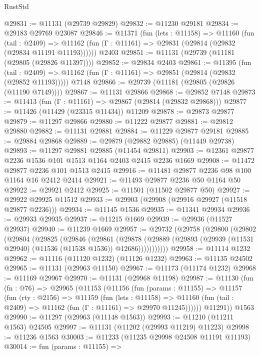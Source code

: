 \begin{lexlean}{RustStd}
\begin{coremodule}
@29831 := @11131 (@29739 @29829)
@29832 := @11230 @29181
@29834 := @29183 @29769 @23087
@29846 := @11371
    (fun (lets : @11158) =>
    @11160
      (fun (tail : @2409) =>
      @11162 (fun (Γ : @11161) => @29831 (@29814 (@29832 (@29834 @11191 @11193))))))
    @2403
@29851 := @11131 (@29739 (@11181 (@29805 (@29826 @11397))))
@29852 := @29834 @2403
@29861 := @11395
    (fun (tail : @2409) => @11162 (fun (Γ : @11161) => @29851 (@29814 (@29832 (@29852 @11193)))))
    @7148
@29866 := @29739 (@11181 (@29805 (@29826 (@11190 @7149))))
@29867 := @11131 @29866
@29868 := @29852 @7148
@29873 := @11413 (fun (Γ : @11161) => @29867 (@29814 (@29832 @29868)))
@29877 := @11426 (@11429 (@23315 @11434)) @11209
@29878 := @29873 @29877
@29879 := @11297 @29866
@29880 := @11222 @29877
@29881 := @29812 @29880
@29882 := @11131 @29881
@29884 := @11229 @29877 @29181
@29885 := @29884 @29868
@29889 := @29879 (@29882 @29885) (@11449 @29738)
@29893 := @11297 @29881 @29885 (@11454 @29811)
@29903 := @12361 @29877 @2236 @1536 @101 @1513 @1164 @2403 @2415 @2236 @1669
@29908 := @11472 @29877 @2236 @101 @1513 @2415
@29916 := @11481 @29877 @2236 @98 @100 @1164 @16 @2412 @2414
@29921 := @11493 @29877 @2236 @50 @1164 @50
@29922 := @29921 @2412
@29925 := @11501 (@11502 @29877 @50)
@29927 := @29922 @29925 @11512
@29933 := @29903 (@29908 (@29916 @29927 (@11518 @29877 @2236)))
@29934 := @11145 @1536
@29935 := @11341 @29934
@29936 := @29933 @29935
@29937 := @11215 @1669
@29939 := @29936 (@11527 @29937)
@29940 := @11239 @1669
@29957 := @29732
    (@29758
      (@29800
        (@29802
          (@29804
            (@29825
              (@29846
                (@29861
                  (@29878
                    (@29889
                      (@29893 (@29939 (@11531 @29940) (@11536 (@11538 @1536)) @12686)))))))))))
@29958 := @11114 @1232
@29962 := @11116 (@11120 @1232) (@11126 @1232)
@29963 := @11135 @24502
@29965 := @11131 (@29963 @11150)
@29967 := @11173 (@11174 @1232)
@29968 := @11169 @29967
@29970 := @11131 (@29968 @11198)
@29987 := @11130
    (fun (fn : @76) =>
    @29965
      (@11153
        (@11156
          (fun (params : @11155) =>
          @11157
            (fun (rty : @2156) =>
            @11159
              (fun (lets : @11158) =>
              @11160 (fun (tail : @2409) => @11162 (fun (Γ : @11161) => @29970 @11245))))))
        @11291))
    @1563
@29990 := @11297 (@29963 (@11148 @1563))
@29993 := @11210 (@11211 @1563) @24505
@29997 := @11131 (@11202 (@29993 @11219) @11223)
@29998 := @11236 @1563
@30003 := @11233 (@11235 @29998 @24508 @11191 @11193)
@30014 := fun (params : @11155) =>

\end{coremodule}
\end{lexlean}
